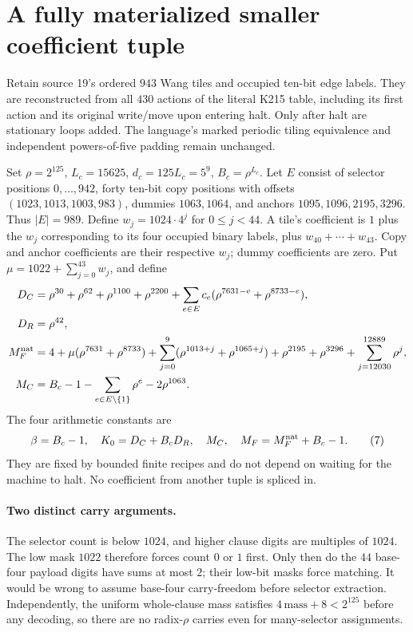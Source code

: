 \documentclass[11pt]{article}
\begin{document}
\section{A fully materialized smaller coefficient tuple}\label{sec:coeff}
Retain source 19's ordered $943$ Wang tiles and occupied ten-bit edge labels.
They are reconstructed from all $430$ actions of the literal K215 table,
including its first action and its original write/move upon entering halt.
Only after halt are stationary loops added. The language's marked periodic
tiling equivalence and independent powers-of-five padding remain unchanged.

Set $\rho=2^{125}$, $L_c=15625$, $d_c=125L_c=5^9$, $B_c=\rho^{L_c}$.
Let $E$ consist of selector positions $0,\ldots,942$, forty ten-bit copy
positions with offsets $(1023,1013,1003,983)$, dummies $1063,1064$, and
anchors $1095,1096,2195,3296$. Thus $|E|=989$. Define $w_j=1024\cdot4^j$
for $0\le j<44$. A tile's coefficient is $1$ plus the $w_j$ corresponding
to its four occupied binary labels, plus $w_{40}+\cdots+w_{43}$.
Copy and anchor coefficients are their respective $w_j$; dummy coefficients
are zero. Put $\mu=1022+\sum_{j=0}^{43}w_j$, and define
\begin{align*}
 D_C&=\rho^{30}+\rho^{62}+\rho^{1100}+\rho^{2200}
       +\sum_{e\in E}c_e(\rho^{7631-e}+\rho^{8733-e}),\\
 D_R&=\rho^{42},\\
 M_F^{\rm nat}&=4+\mu(\rho^{7631}+\rho^{8733})
  +\sum_{j=0}^{9}(\rho^{1013+j}+\rho^{1065+j})
  +\rho^{2195}+\rho^{3296}+\sum_{j=12030}^{12889}\rho^j,\\
 M_C&=B_c-1-\sum_{e\in E\setminus\{1\}}\rho^e-2\rho^{1063}.
\end{align*}
The four arithmetic constants are
\[
 \beta=B_c-1,\quad K_0=D_C+B_cD_R,\quad M_C,
 \quad M_F=M_F^{\rm nat}+B_c-1.
\tag{7}\label{eq:coeff}
\]
They are fixed by bounded finite recipes and do not depend on waiting for
the machine to halt. No coefficient from another tuple is spliced in.

\paragraph{Two distinct carry arguments.}
The selector count is below $1024$, and higher clause digits are multiples
of $1024$. The low mask $1022$ therefore forces count $0$ or $1$ first.
Only then do the $44$ base-four payload digits have sums at most $2$;
their low-bit masks force matching. It would be wrong to assume base-four
carry-freedom before selector extraction. Independently, the uniform
whole-clause mass satisfies $4\,\mathrm{mass}+8<2^{125}$ before any decoding,
so there are no radix-$\rho$ carries even for many-selector assignments.
\end{document}

